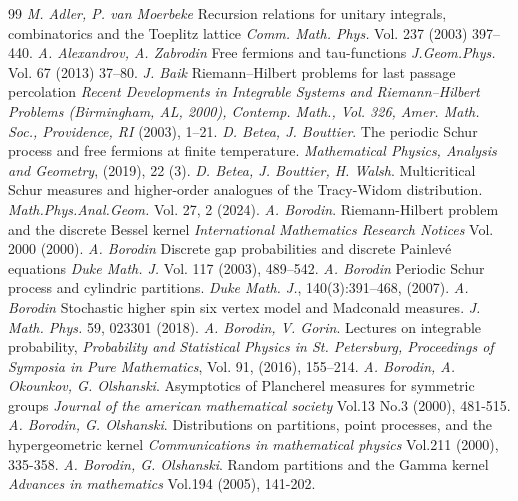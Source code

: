 \documentclass[12pt]{amsart}
\theoremstyle{definition}
\begin{document}
\begin{thebibliography}{99}
 \emph{M. Adler, P. van Moerbeke} Recursion relations for unitary integrals, combinatorics and the Toeplitz lattice {\it Comm. Math. Phys. } Vol. 237 (2003) 397--440.
 \emph{A. Alexandrov, A. Zabrodin} Free fermions and tau-functions {\it J.Geom.Phys.} Vol. 67 (2013) 37--80.
 \emph{J. Baik} Riemann–Hilbert problems for last passage percolation {\it Recent Developments in Integrable
Systems and Riemann–Hilbert Problems (Birmingham, AL, 2000), Contemp. Math., Vol. 326, Amer. Math. Soc., Providence, RI} (2003), 1--21.
 \emph{D. Betea, J. Bouttier}. The periodic Schur process and free fermions at finite temperature. { \it Mathematical Physics, Analysis and Geometry}, (2019), 22 (3).
 \emph{D. Betea, J. Bouttier, H. Walsh}. Multicritical Schur measures and higher-order analogues of the Tracy-Widom distribution. {\it Math.Phys.Anal.Geom.} Vol. 27, 2 (2024). 
 \emph{A. Borodin}. Riemann-Hilbert problem and the discrete Bessel kernel {\it International Mathematics Research Notices} Vol. 2000 (2000).
 \emph{A. Borodin} Discrete gap probabilities and discrete Painlev\'e equations {\it Duke Math. J.} Vol. 117 (2003), 489--542.
 \emph{A. Borodin} Periodic Schur process and cylindric partitions. { \it Duke Math. J.}, 140(3):391–468, (2007).
 \emph{A. Borodin} Stochastic higher spin six vertex model and Madconald measures. { \it J. Math. Phys.} 59, 023301 (2018).
\emph{A. Borodin, V. Gorin}. Lectures on integrable probability, {\it Probability and Statistical Physics in St. Petersburg, Proceedings of Symposia in Pure Mathematics}, Vol. 91, (2016), 155–214.
 \emph{A. Borodin, A. Okounkov, G. Olshanski}. Asymptotics of Plancherel measures for symmetric groups {\it Journal of the american mathematical society} Vol.13 No.3 (2000), 481-515.
\emph{A. Borodin, G. Olshanski}. Distributions on partitions, point processes, and the hypergeometric kernel {\it Communications in mathematical physics} Vol.211 (2000), 335-358. 
\emph{A. Borodin, G. Olshanski}. Random partitions and the Gamma kernel {\it Advances in mathematics} Vol.194 (2005), 141-202.

\end{thebibliography}
\end{document}

